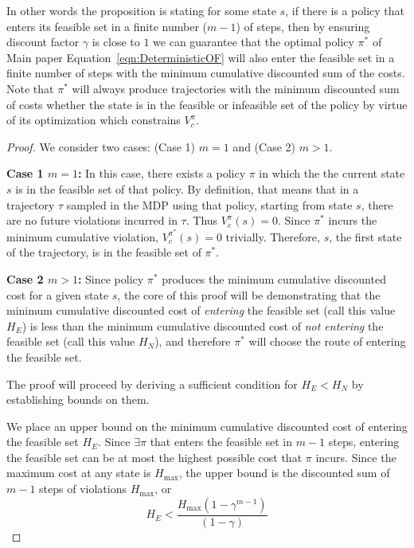 \documentclass{article}
\theoremstyle{definition}
\begin{document}
In other words the proposition is stating for some state $s$, if there is a policy that enters its feasible set in a finite number ($m-1$) of steps, then by ensuring discount factor $\gamma$ is close to $1$ we can guarantee that the optimal policy $\pi^*$ of Main paper Equation~\ref{eqn:DeterministicOF} will also enter the feasible set in a finite number of steps with the minimum cumulative discounted sum of the costs. Note that $\pi^*$ will always produce trajectories with the minimum discounted sum of costs whether the state is in the feasible or infeasible set of the policy by virtue of its optimization which constrains $V^\pi_c$.
\begin{proof}
    We consider two cases: (Case 1) $m=1$ and (Case 2) $m>1$.

    \textbf{Case 1 $m=1$:} In this case, there exists a policy $\pi$ in which the the current state $s$ is in the feasible set of that policy. By definition, that means that in a trajectory $\tau$ sampled in the MDP using that policy, starting from state $s$, there are no future violations incurred in $\tau$. Thus $V^\pi_c(s)=0$. Since $\pi^*$ incurs the minimum cumulative violation,  $V^{\pi^*}_c(s)=0$ trivially. Therefore, $s$, the first state of the trajectory, is in the feasible set of $\pi^*$. 
    
    \textbf{Case 2 $m>1$:} Since policy $\pi^*$ produces the minimum cumulative discounted cost for a given state $s$, the core of this proof will be demonstrating that the minimum cumulative discounted cost of \emph{entering} the feasible set (call this value $H_E$) is less than the minimum cumulative discounted cost of \emph{not entering} the feasible set (call this value $H_N$), and therefore $\pi^*$ will choose the route of entering the feasible set.

    The proof will proceed by deriving a sufficient condition for $H_E<H_N$ by establishing bounds on them. 
    

    We place an upper bound on the minimum cumulative discounted cost of entering the feasible set $H_E$. Since $\exists\pi$ that enters the feasible set in $m-1$ steps, entering the feasible set can be at most the highest possible cost that $\pi$ incurs. Since the maximum cost at any state is $H_{\max}$, the upper bound is the discounted sum of $m-1$ steps of violations $H_{\max}$, or 
    \begin{equation*}
        H_E < \frac{H_{\max}(1-\gamma^{m-1})}{(1-\gamma)}
    \end{equation*}


\end{proof}
\end{document}
